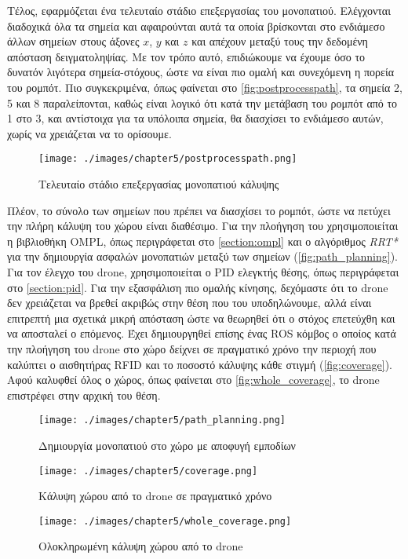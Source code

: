 Τέλος, εφαρμόζεται ένα τελευταίο στάδιο επεξεργασίας του μονοπατιού. Ελέγχονται διαδοχικά όλα τα σημεία και αφαιρούνται αυτά τα οποία βρίσκονται στο ενδιάμεσο άλλων σημείων στους άξονες $x$, $y$ και $z$ και απέχουν μεταξύ τους την δεδομένη απόσταση δειγματοληψίας. Με τον τρόπο αυτό, επιδιώκουμε να έχουμε όσο το δυνατόν λιγότερα σημεία-στόχους, ώστε να είναι πιο ομαλή και συνεχόμενη η πορεία του ρομπότ. Πιο συγκεκριμένα, όπως φαίνεται στο \autoref{fig:postprocesspath}, τα σημεία 2, 5 και 8 παραλείπονται, καθώς είναι λογικό ότι κατά την μετάβαση του ρομπότ από το 1 στο 3, και αντίστοιχα για τα υπόλοιπα σημεία, θα διασχίσει το ενδιάμεσο αυτών, χωρίς να χρειάζεται να το ορίσουμε.

\begin{figure}[!h]
    \centering
    \texttt{[image: ./images/chapter5/postprocesspath.png]}
    \caption{Τελευταίο στάδιο επεξεργασίας μονοπατιού κάλυψης}
    \label{fig:postprocesspath}
\end{figure} 

Πλέον, το σύνολο των σημείων που πρέπει να διασχίσει το ρομπότ, ώστε να πετύχει την πλήρη κάλυψη του χώρου είναι διαθέσιμο. Για την πλοήγηση του χρησιμοποιείται η βιβλιοθήκη OMPL, όπως περιγράφεται στο \autoref{section:ompl} και ο αλγόριθμος \emph{RRT*} για την δημιουργία ασφαλών μονοπατιών μεταξύ των σημείων (\autoref{fig:path_planning}). Για τον έλεγχο του drone, χρησιμοποιείται ο PID ελεγκτής θέσης, όπως περιγράφεται στο \autoref{section:pid}. Για την εξασφάλιση πιο ομαλής κίνησης, δεχόμαστε ότι το drone δεν χρειάζεται να βρεθεί ακριβώς στην θέση που του υποδηλώνουμε, αλλά είναι επιτρεπτή μια σχετικά μικρή απόσταση ώστε να θεωρηθεί ότι ο στόχος επετεύχθη και να αποσταλεί ο επόμενος. Έχει δημιουργηθεί επίσης ένας ROS κόμβος ο οποίος κατά την πλοήγηση του drone στο χώρο δείχνει σε πραγματικό χρόνο την περιοχή που καλύπτει ο αισθητήρας RFID και το ποσοστό κάλυψης κάθε στιγμή (\autoref{fig:coverage}). Αφού καλυφθεί όλος ο χώρος, όπως φαίνεται στο \autoref{fig:whole_coverage}, το drone επιστρέφει στην αρχική του θέση.

\begin{figure}[!ht]
    \centering
    \texttt{[image: ./images/chapter5/path\_planning.png]}
    \caption{Δημιουργία μονοπατιού στο χώρο με αποφυγή εμποδίων}
    \label{fig:path_planning}
\end{figure} 

\begin{figure}[!ht]
    \centering
    \texttt{[image: ./images/chapter5/coverage.png]}
    \caption{Κάλυψη χώρου από το drone σε πραγματικό χρόνο}
    \label{fig:coverage}
\end{figure} 

\begin{figure}[!ht]
    \centering
    \texttt{[image: ./images/chapter5/whole\_coverage.png]}
    \caption{Ολοκληρωμένη κάλυψη χώρου από το drone}
    \label{fig:whole_coverage}
\end{figure} 